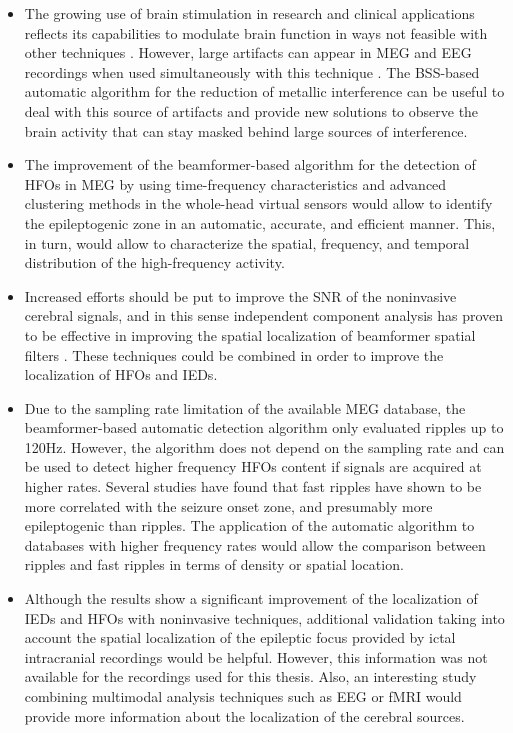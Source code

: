 \begin{itemize}
\item The growing use of brain stimulation in research and clinical applications reflects its capabilities to modulate brain function in ways not feasible with other techniques \citep{Peterchev2012}. However, large artifacts can appear in MEG and EEG recordings when used simultaneously with this technique \citep{Oswal2016,Haumann2016}. The BSS-based automatic algorithm for the reduction of metallic interference can be useful to deal with this source of artifacts and provide new solutions to observe the brain activity that can stay masked behind large sources of interference.

\item The improvement of the beamformer-based algorithm for the detection of HFOs in MEG by using time-frequency characteristics and advanced clustering methods \citep{Liu2016} in the whole-head virtual sensors would allow to  identify the epileptogenic zone in an automatic, accurate, and efficient manner. This, in turn, would allow to characterize the spatial, frequency, and temporal distribution of the high-frequency activity. 

\item Increased efforts should be put to improve the SNR of the noninvasive cerebral signals, and in this sense independent component analysis has proven to be effective in improving the spatial localization of beamformer spatial filters \citep{Fatima2013}. These techniques could be combined in order to improve the localization of HFOs and IEDs. 

\item  Due to the sampling rate limitation of the available MEG database, the beamformer-based automatic detection algorithm only evaluated ripples up to 120Hz. However, the algorithm does not depend on the sampling rate and can be used to detect higher frequency HFOs content if signals are acquired at higher rates. Several studies have found that fast ripples have shown to be more correlated with the seizure onset zone, and presumably more epileptogenic \citep{Jacobs2008,vanKlink2014,Zijlmans2012} than ripples. The application of the automatic algorithm to databases with higher frequency rates would allow the comparison between ripples and fast ripples in terms of density or spatial location. 

\item Although the results show a significant improvement of the localization of IEDs and HFOs with noninvasive techniques, additional validation taking into account the spatial localization of the epileptic focus provided by ictal intracranial recordings would be helpful. However, this information was not available for the recordings used for this thesis. Also, an interesting study combining multimodal analysis techniques such as EEG or fMRI would provide more information about the localization of the cerebral sources.


\end{itemize}
